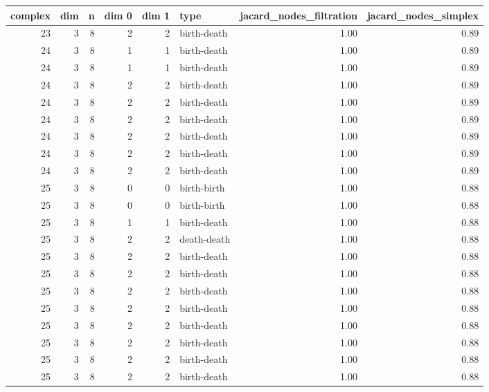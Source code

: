 \documentclass{article}
\begin{document}
\begin{center}
\begin{tabular}{rrrrrlrr}
\toprule
complex & dim & n & dim 0 & dim 1 & type & jacard\_nodes\_filtration & jacard\_nodes\_simplex \\
\midrule
23 & 3 & 8 & 2 & 2 & birth-death & 1.00 & 0.89 \\
24 & 3 & 8 & 1 & 1 & birth-death & 1.00 & 0.89 \\
24 & 3 & 8 & 1 & 1 & birth-death & 1.00 & 0.89 \\
24 & 3 & 8 & 2 & 2 & birth-death & 1.00 & 0.89 \\
24 & 3 & 8 & 2 & 2 & birth-death & 1.00 & 0.89 \\
24 & 3 & 8 & 2 & 2 & birth-death & 1.00 & 0.89 \\
24 & 3 & 8 & 2 & 2 & birth-death & 1.00 & 0.89 \\
24 & 3 & 8 & 2 & 2 & birth-death & 1.00 & 0.89 \\
24 & 3 & 8 & 2 & 2 & birth-death & 1.00 & 0.89 \\
25 & 3 & 8 & 0 & 0 & birth-birth & 1.00 & 0.88 \\
25 & 3 & 8 & 0 & 0 & birth-birth & 1.00 & 0.88 \\
25 & 3 & 8 & 1 & 1 & birth-death & 1.00 & 0.88 \\
25 & 3 & 8 & 2 & 2 & death-death & 1.00 & 0.88 \\
25 & 3 & 8 & 2 & 2 & birth-death & 1.00 & 0.88 \\
25 & 3 & 8 & 2 & 2 & birth-death & 1.00 & 0.88 \\
25 & 3 & 8 & 2 & 2 & birth-death & 1.00 & 0.88 \\
25 & 3 & 8 & 2 & 2 & birth-death & 1.00 & 0.88 \\
25 & 3 & 8 & 2 & 2 & birth-death & 1.00 & 0.88 \\
25 & 3 & 8 & 2 & 2 & birth-death & 1.00 & 0.88 \\
25 & 3 & 8 & 2 & 2 & birth-death & 1.00 & 0.88 \\
25 & 3 & 8 & 2 & 2 & birth-death & 1.00 & 0.88 \\
\bottomrule
\end{tabular}
\end{center}
\end{document}
